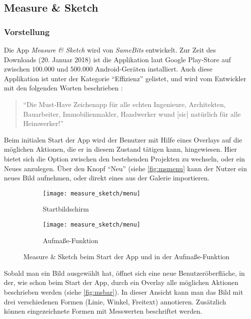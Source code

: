 \subsection{Measure \& Sketch}
\subsubsection{Vorstellung}
Die App \emph{Measure \& Sketch} wird von \emph{SameBits} entwickelt.
Zur Zeit des Downloads (20. Januar 2018) ist die Applikation laut Google Play-Store auf zwischen $100.000$ und $500.000$ Android-Geräten installiert.
Auch diese Applikation ist unter der Kategorie ``Effizienz'' gelistet, und wird vom Entwickler mit den folgenden Worten beschrieben \citep{BitsMS}:

\begin{quote}
  ``Die Must-Have Zeichenapp für alle echten Ingenieure, Architekten, Bauarbeiter, Immobilienmakler, Handwerker wund [sic] natürlich für alle Heimwerker!''
\end{quote}

\noindent
Beim initialen Start der App wird der Benutzer mit Hilfe eines Overlays auf die möglichen Aktionen, die er in diesem Zustand tätigen kann, hingewiesen.
Hier bietet sich die Option zwischen den bestehenden Projekten zu wechseln, oder ein Neues anzulegen.
Über den Knopf ``Neu'' (siehe \autoref{fig:msmenu} kann der Nutzer ein neues Bild aufnehmen, oder direkt eines aus der Galerie importieren. \\

\begin{figure}[h]
  \centering
	\begin{subfigure}[t]{0.4\textwidth}
		\texttt{[image: measure\_sketch/menu]}
		\caption{Startbildschirm}
		\label{fig:msmenu}	
	\end{subfigure}
	\begin{subfigure}[t]{0.4\textwidth}
		\texttt{[image: measure\_sketch/menu]}
		\caption{Aufmaße-Funktion} 
		\label{fig:msbar}	
	\end{subfigure}
  \caption{Measure \& Sketch beim Start der App und in der Aufmaße-Funktion}
\end{figure}

\noindent
{}
Sobald man ein Bild ausgewählt hat, öffnet sich eine neue Benutzeröberfläche, in der, wie schon beim Start der App, durch ein Overlay alle möglichen Aktionen beschrieben werden (siehe \autoref{fig:msbar}).
In dieser Ansicht kann man das Bild mit drei verschiedenen Formen (Linie, Winkel, Freitext) annotieren. 
Zusätzlich können eingezeichnete Formen mit Messwerten beschriftet werden.\\

